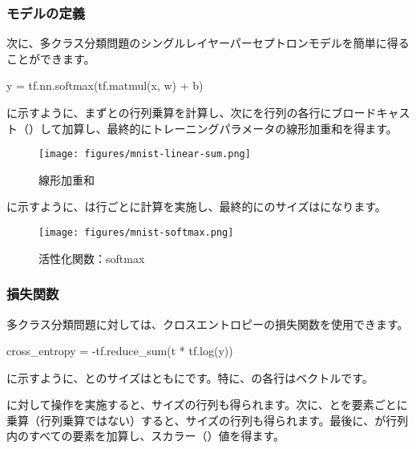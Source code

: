 \begin{content}
\begin{content}
\subsubsection{モデルの定義}

次に、多クラス分類問題のシングルレイヤーパーセプトロンモデルを簡単に得ることができます。

\begin{leftbar}
\begin{python}
y = tf.nn.softmax(tf.matmul(x, w) + b)
\end{python}
\end{leftbar}

に示すように、まずとの行列乗算を計算し、次にを行列の各行にブロードキャスト（）して加算し、最終的にトレーニングパラメータの線形加重和を得ます。

\begin{figure}[H]
\centering
\texttt{[image: figures/mnist-linear-sum.png]}
\caption{線形加重和}
 \label{fig:mnist-linear-sum}
\end{figure}

に示すように、は行ごとに計算を実施し、最終的にのサイズは\code{[100, 10]}になります。

\begin{figure}[H]
\centering
\texttt{[image: figures/mnist-softmax.png]}
\caption{活性化関数：softmax}
 \label{fig:mnist-softmax}
\end{figure}

\subsubsection{損失関数}

多クラス分類問題に対しては、クロスエントロピーの損失関数を使用できます。

\begin{leftbar}
\begin{python}
cross_entropy = -tf.reduce_sum(t * tf.log(y))
\end{python}
\end{leftbar}

に示すように、とのサイズはともに\code{[100, 10]}です。特に、の各行はベクトルです。

に対して操作を実施すると、サイズ\code{[100, 10]}の行列も得られます。次に、とを要素ごとに乗算（行列乗算ではない）すると、サイズ\code{[100, 10]}の行列も得られます。最後に、が行列内のすべての要素を加算し、スカラー（）値を得ます。


\end{content}
\end{content}
